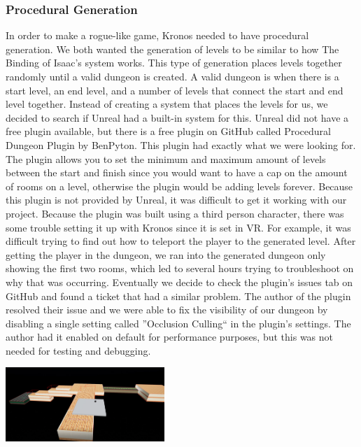 \documentclass{sigchi}
\begin{document}
\subsubsection*{Procedural Generation}
In order to make a rogue-like game, Kronos needed to have procedural generation. We both wanted the generation of levels to be similar to how The Binding of Isaac's \cite{isaac} system works. This type of generation places levels together randomly until a valid dungeon is created. A valid dungeon is when there is a start level, an end level, and a number of levels that connect the start and end level together. Instead of creating a system that places the levels for us, we decided to search if Unreal had a built-in system for this. Unreal did not have a free plugin available, but there is a free plugin on GitHub called Procedural Dungeon Plugin by BenPyton. This plugin had exactly what we were looking for. The plugin allows you to set the minimum and maximum amount of levels between the start and finish since you would want to have a cap on the amount of rooms on a level, otherwise the plugin would be adding levels forever. Because this plugin is not provided by Unreal, it was difficult to get it working with our project. Because the plugin was built using a third person character, there was some trouble setting it up with Kronos since it is set in VR. For example, it was difficult trying to find out how to teleport the player to the generated level. After getting the player in the dungeon, we ran into the generated dungeon only showing the first two rooms, which led to several hours trying to troubleshoot on why that was occurring. Eventually we decide to check the plugin's issues tab on GitHub and found a ticket that had a similar problem. The author of the plugin resolved their issue and we were able to fix the visibility of our dungeon by disabling a single setting called ''Occlusion Culling`` in the plugin's settings. The author had it enabled on default for performance purposes, but this was not needed for testing and debugging.
\begin{center}
    \includegraphics[width=0.45\textwidth]{dungeon.png}
    \label{fig:Sprites}
\end{center}
\end{document}
